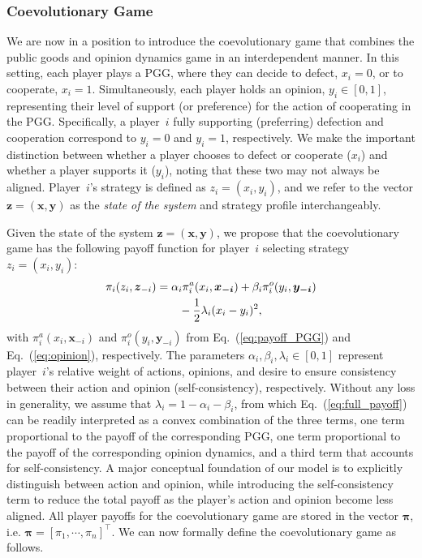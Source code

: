 \documentclass[letterpaper, 10 pt, conference]{ieeeconf}  %
\newcommand{\vect}[1]{\boldsymbol{#1}}
\renewcommand{\eqref}[1]{Eq.~(\ref{#1})}  %
\begin{document}
\subsubsection*{Coevolutionary Game} We are now in a position to introduce the coevolutionary game that combines the public goods and opinion dynamics game in an interdependent manner. In this setting, each player plays a PGG, where they can decide to defect, $x_i=0$, or to cooperate, $x_i=1$. Simultaneously, each player holds an opinion, $y_i \in [0,1]$, representing their level of support (or preference) for the action of cooperating in the PGG. Specifically, a player~$i$ fully supporting (preferring) defection and cooperation correspond to $y_i=0$ and $y_i=1$, respectively. We make the important distinction between whether a player chooses to defect or cooperate ($x_i$) and whether a player supports it ($y_i$), noting that these two may not always be aligned. Player~$i$'s strategy is defined as $z_i = (x_i, y_i)$, and we refer to the vector $\vect{z}= (\vect x, \vect y)$ as the \textit{state of the system} and strategy profile interchangeably.

Given the state of the system $\boldsymbol{z}=(\boldsymbol{x},\boldsymbol{y})$, we propose that the coevolutionary game has the following payoff function for player~$i$ selecting strategy $z_i = (x_i, y_i)$:
\begin{align}\label{eq:full_payoff}
    \pi_i(z_i,\vect{z}_{-i}) &= \alpha_i\pi_i^{a}(x_i,\vect{x_{-i}}) + \beta_i\pi_i^{o}(y_i,\vect{y_{-i}}) \notag \\ 
    & \qquad - \dfrac{1}{2}\lambda_i(x_i-y_i)^2,
\end{align}
with $\pi_i^{a}(x_i,\vect{x}_{-i})$ and $\pi_i^{o}(y_i,\vect{y}_{-i})$ from \eqref{eq:payoff_PGG} and \eqref{eq:opinion}, respectively. 
The parameters $\alpha_i,\beta_i,\lambda_i \in [0,1]$ represent player~$i$'s relative weight of actions, opinions, and desire to ensure consistency between their action and opinion (self-consistency), respectively. Without any loss in generality, we assume that $\lambda_i=1-\alpha_i-\beta_i$, from which \eqref{eq:full_payoff} can be readily interpreted as a convex combination of the three terms, one term proportional to the payoff of the corresponding PGG, one term proportional to the payoff of the corresponding opinion dynamics, and a third term that accounts for self-consistency. A major conceptual foundation of our model is to explicitly distinguish between action and opinion, while introducing the self-consistency term to reduce the total payoff as the player's action and opinion become less aligned.  All player payoffs for the coevolutionary game are stored in the vector $\vect{\pi}$, i.e. $\vect{\pi} = [\pi_1, \cdots, \pi_n]^\top$. We can now formally define the coevolutionary game as follows.
\end{document}
